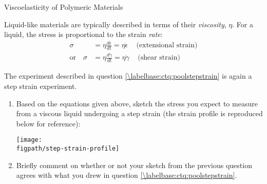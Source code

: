 \begin{activity}{Viscoelasticity of Polymeric Materials}
\begin{ctqs}
\begin{enumerate}
		\end{enumerate}
	
\end{ctqs}

\begin{infobox}
	
	Liquid-like materials are typically described in terms of their \emph{viscosity}, $\eta$.  For a liquid, the stress is proportional to the strain \emph{rate}:
	\begin{align*}
		\sigma &= \eta\frac{d\epsilon}{dt}=\eta\dot\epsilon\,\,\,\,\,\,\,\text{(extensional strain)}\\
		\text{or}\,\,\,\,\,\,\sigma &= \eta\frac{d\gamma}{dt}=\eta\dot\gamma\,\,\,\,\,\,\,\text{(shear strain)}
	\end{align*}

\end{infobox}

\clearpage
\begin{ctqs}

	\question The experiment described in question \ref{\labelbase:ctq:poolstepstrain} is again a step strain experiment.
	
		\begin{enumerate}
			\item Based on the equations given above, sketch the stress you expect to measure from a viscous liquid undergoing a step strain (the strain profile is reproduced below for reference):
			
				\begin{solution}[3.5in]
					\vspace{6pt}
					\centerline{\texttt{[image: \\figpath/step-strain-profile]}}
					\vspace{6pt}
				\end{solution}
				
			\item Briefly comment on whether or not your sketch from the previous question agrees with what you drew in question \ref{\labelbase:ctq:poolstepstrain}.
			

\end{enumerate}
\end{ctqs}
\end{activity}
